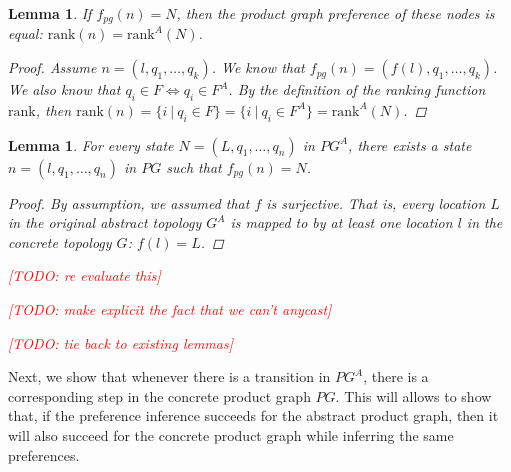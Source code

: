 \documentclass[twocolumn, openany]{sig-alternate-10pt}
\newcommand{\todo}[1]{\textcolor{red}{[TODO: #1]}}
\newcommand{\Rank}{\ensuremath{\mathrm{rank}}}
\newtheorem{lem}[thm]{Lemma}
\begin{document}
\begin{lem}
  If $f_{pg}(n) = N$, then the product graph preference of these nodes is equal: $\Rank(n) = \Rank^A(N)$.

  \begin{proof}
    Assume $n = (l,q_1,\dots,q_k)$. We know that $f_{pg}(n) = (f(l),q_1,\dots,q_k)$. 
    We also know that $q_i \in F \iff q_i \in F^A$. 
    By the definition of the ranking function $\Rank$, then 
    $\Rank(n) = \{ i ~\vert~ q_i \in F \} = \{ i ~\vert~ q_i \in F^A \} = \Rank^A(N)$.
  \end{proof}

\end{lem}


\begin{lem}
  For every state $N = (L, q_1, \dots, q_n)$ in $PG^A$, there exists a state $n = (l,q_1, \ldots, q_n)$ in $PG$
  such that $f_{pg}(n) = N$.

  \begin{proof}
    By assumption, we assumed that $f$ is surjective. That is, every location $L$ in the original abstract topology $G^A$ is mapped to by at least one location $l$ in the concrete topology $G$: $f(l) = L$. 
  \end{proof}

  \todo{re evaluate this}

  \todo{make explicit the fact that we can't anycast}

  \todo{tie back to existing lemmas}

\end{lem}

\vspace{1em}

Next, we show that whenever there is a transition in $PG^A$, there is a corresponding step in the concrete product graph $PG$. This will allows to show that, if the preference inference succeeds for the abstract product graph, then it will also succeed for the concrete product graph while inferring the same preferences.

\vspace{1em}
\end{document}
